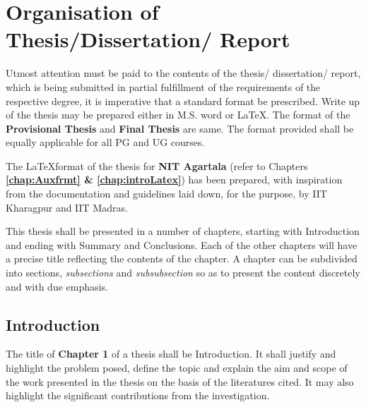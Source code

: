 \chapter{ Organisation of Thesis/Dissertation/ Report} 
 
Utmost attention must be paid to the contents of the thesis/ dissertation/ report, which is being submitted in partial fulfillment of the requirements of the respective degree, it is imperative that a standard format be prescribed. Write up of the thesis may be prepared either in M.S. word or \LaTeX. The format of the \textbf{Provisional Thesis} and \textbf{Final Thesis} are same. The format provided shall be equally applicable for all PG and UG courses.
 
 The \LaTeX   format of the thesis for \textbf{NIT Agartala} (refer to Chapters \textbf{\ref{chap:Auxfrmt} \& \ref{chap:introLatex}}) has been prepared, with inspiration from the documentation and guidelines laid down, for the purpose, by IIT Kharagpur and IIT Madras.

\par This thesis shall be presented in a number of chapters, starting with Introduction and ending with Summary and Conclusions. Each of the other chapters will have a precise title reflecting the contents of the chapter. A chapter can be subdivided into sections, \emph{subsections} and \emph{subsubsection} so as to present the content discretely and with due emphasis.
\section{Introduction}
\par The title of \textbf{Chapter 1} of a thesis shall be Introduction. It shall justify and highlight the problem posed, define the topic and explain the aim and scope of the work presented in the thesis on the basis of the literatures cited. It may also highlight the significant contributions from the investigation. 

